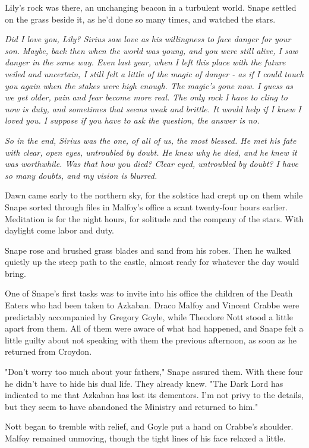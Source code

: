 \documentclass[a4paper,11pt]{article}
\begin{document}
Lily's rock was there, an unchanging beacon in a turbulent world. Snape settled on the grass beside it, as he'd done so many times, and watched the stars.

\emph{Did I love you, Lily? Sirius saw love as his willingness to face danger for your son. Maybe, back then when the world was young, and you were still alive, I saw danger in the same way. Even last year, when I left this place with the future veiled and uncertain, I still felt a little of the magic of danger - as if I could touch you again when the stakes were high enough. The magic's gone now. I guess as we get older, pain and fear become more real. The only rock I have to cling to now is duty, and sometimes that seems weak and brittle. It would help if I knew I loved you. I suppose if you have to ask the question, the answer is no.}

\emph{So in the end, Sirius was the one, of all of us, the most blessed. He met his fate with clear, open eyes, untroubled by doubt. He knew why he died, and he knew it was worthwhile. Was that how you died? Clear eyed, untroubled by doubt? I have so many doubts, and my vision is blurred.}

Dawn came early to the northern sky, for the solstice had crept up on them while Snape sorted through files in Malfoy's office a scant twenty-four hours earlier. Meditation is for the night hours, for solitude and the company of the stars. With daylight come labor and duty.

Snape rose and brushed grass blades and sand from his robes. Then he walked quietly up the steep path to the castle, almost ready for whatever the day would bring.

One of Snape's first tasks was to invite into his office the children of the Death Eaters who had been taken to Azkaban. Draco Malfoy and Vincent Crabbe were predictably accompanied by Gregory Goyle, while Theodore Nott stood a little apart from them. All of them were aware of what had happened, and Snape felt a little guilty about not speaking with them the previous afternoon, as soon as he returned from Croydon.

"Don't worry too much about your fathers," Snape assured them. With these four he didn't have to hide his dual life. They already knew. "The Dark Lord has indicated to me that Azkaban has lost its dementors. I'm not privy to the details, but they seem to have abandoned the Ministry and returned to him."

Nott began to tremble with relief, and Goyle put a hand on Crabbe's shoulder. Malfoy remained unmoving, though the tight lines of his face relaxed a little.
\end{document}
